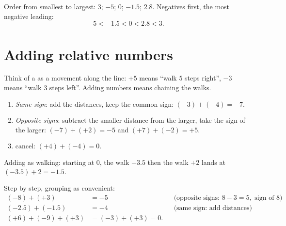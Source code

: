 \begin{example}\label{ex:g7:negatives:compare}
Order from smallest to largest: $3$; $-5$; $0$; $-1.5$; $2.8$.
Negatives first, the most negative leading:
\[
-5 < -1.5 < 0 < 2.8 < 3 .
\]
\end{example}

\section{Adding relative numbers}

Think of a  as a movement along the line: $+5$ means
``walk $5$ steps right'', $-3$ means ``walk $3$ steps left''. Adding
numbers means chaining the walks.

\begin{method}\label{met:g7:negatives:add}
\begin{enumerate}
  \item \emph{Same sign}: add the distances, keep the common sign:
        $(-3) + (-4) = -7$.
  \item \emph{Opposite signs}: subtract the smaller distance from the
        larger, take the sign of the larger:
        $(-7) + (+2) = -5$ and $(+7) + (-2) = +5$.
  \item {} cancel: $(+4) + (-4) = 0$.
\end{enumerate}
\end{method}

\begin{omfigure}

{\small Adding as walking: starting at $0$, the walk $-3.5$ then the
walk $+2$ lands at $(-3.5) + 2 = -1.5$.}
\end{omfigure}

\begin{example}\label{ex:g7:negatives:add}
Step by step, grouping as convenient:
\begin{align*}
(-8) + (+3) &= -5 && \text{(opposite signs: } 8 - 3 = 5,
\text{ sign of } 8)\\
(-2.5) + (-1.5) &= -4 && \text{(same sign: add distances)}\\
(+6) + (-9) + (+3) &= (-3) + (+3) = 0 .
\end{align*}
\end{example}

